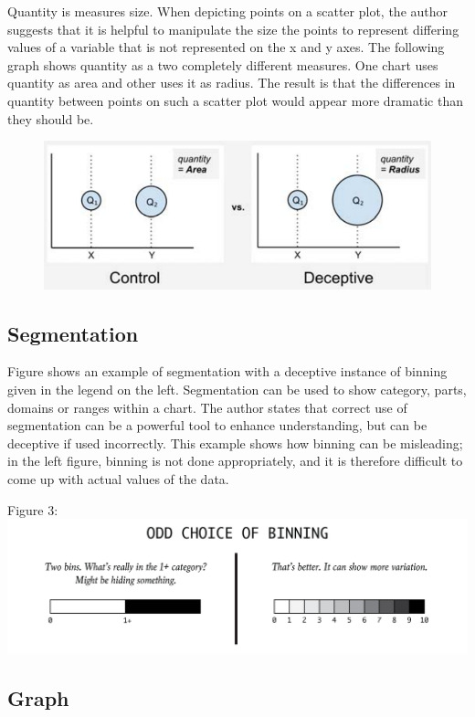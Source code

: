 \documentclass[]{book}
\theoremstyle{definition}
\theoremstyle{definition}
\theoremstyle{definition}
\theoremstyle{remark}
\begin{document}
Quantity is measures size. When depicting points on a scatter plot, the
author suggests that it is helpful to manipulate the size the points to
represent differing values of a variable that is not represented on the
x and y axes. The following graph shows quantity as a two completely
different measures. One chart uses quantity as area and other uses it as
radius. The result is that the differences in quantity between points on
such a scatter plot would appear more dramatic than they should be.

\begin{figure}
\centering
\includegraphics{images/Quantity1.png}
\caption{}
\end{figure}

\subsection{Segmentation}\label{segmentation}

Figure shows an example of segmentation with a deceptive instance of
binning given in the legend on the left. Segmentation can be used to
show category, parts, domains or ranges within a chart. The author
states that correct use of segmentation can be a powerful tool to
enhance understanding, but can be deceptive if used incorrectly. This
example shows how binning can be misleading; in the left figure, binning
is not done appropriately, and it is therefore difficult to come up with
actual values of the data.

Figure 3: \includegraphics{images/Segmentation 1.png}

\subsection{Graph}\label{graph}
\end{document}
